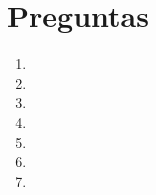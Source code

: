 \documentclass[11pt]{article}
\begin{document}



\section*{Preguntas}

\begin{enumerate}
    \item  \medskip

    \item  \medskip

    \item  \medskip

    \item  \medskip

    \item  \medskip

    \item  \medskip

    \item 
\end{enumerate}
\thispagestyle{empty}
\end{document}
